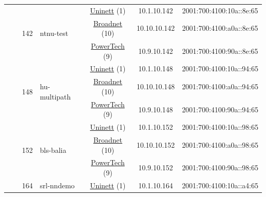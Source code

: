 \begin{small}
\begin{center}
\begin{longtable}{|c|c|c|c|c|c|c|c|}
  &  & \multirow{3}{*}{\tiny{142}} & \multicolumn{1}{|l|}{\multirow{3}{*}{\tiny{ntnu-test}}} & \multicolumn{2}{|c|}{\tiny{\href{https://www.uninett.no}{Uninett} (1)}} & \tiny{10.1.10.142} & \tiny{2001:700:4100:10a::8e:65} \\* \cline{5-5}\cline{6-6}\cline{7-7}\cline{8-8}
  &  &  &  & \multicolumn{2}{|c|}{\tiny{\href{https://www.broadnet.no}{Broadnet} (10)}} & \tiny{10.10.10.142} & \tiny{2001:700:4100:a0a::8e:65} \\* \cline{5-5}\cline{6-6}\cline{7-7}\cline{8-8}
  &  &  &  & \multicolumn{2}{|c|}{\tiny{\href{http://www.powertech.no}{PowerTech} (9)}} & \tiny{10.9.10.142} & \tiny{2001:700:4100:90a::8e:65} \\* \cline{3-3}\cline{4-4}\cline{5-5}\cline{6-6}\cline{7-7}\cline{8-8}
  &  & \multirow{3}{*}{\tiny{148}} & \multicolumn{1}{|l|}{\multirow{3}{*}{\tiny{hu-multipath}}} & \multicolumn{2}{|c|}{\tiny{\href{https://www.uninett.no}{Uninett} (1)}} & \tiny{10.1.10.148} & \tiny{2001:700:4100:10a::94:65} \\* \cline{5-5}\cline{6-6}\cline{7-7}\cline{8-8}
  &  &  &  & \multicolumn{2}{|c|}{\tiny{\href{https://www.broadnet.no}{Broadnet} (10)}} & \tiny{10.10.10.148} & \tiny{2001:700:4100:a0a::94:65} \\* \cline{5-5}\cline{6-6}\cline{7-7}\cline{8-8}
  &  &  &  & \multicolumn{2}{|c|}{\tiny{\href{http://www.powertech.no}{PowerTech} (9)}} & \tiny{10.9.10.148} & \tiny{2001:700:4100:90a::94:65} \\* \cline{3-3}\cline{4-4}\cline{5-5}\cline{6-6}\cline{7-7}\cline{8-8}
  &  & \multirow{3}{*}{\tiny{152}} & \multicolumn{1}{|l|}{\multirow{3}{*}{\tiny{bls-balia}}} & \multicolumn{2}{|c|}{\tiny{\href{https://www.uninett.no}{Uninett} (1)}} & \tiny{10.1.10.152} & \tiny{2001:700:4100:10a::98:65} \\* \cline{5-5}\cline{6-6}\cline{7-7}\cline{8-8}
  &  &  &  & \multicolumn{2}{|c|}{\tiny{\href{https://www.broadnet.no}{Broadnet} (10)}} & \tiny{10.10.10.152} & \tiny{2001:700:4100:a0a::98:65} \\* \cline{5-5}\cline{6-6}\cline{7-7}\cline{8-8}
  &  &  &  & \multicolumn{2}{|c|}{\tiny{\href{http://www.powertech.no}{PowerTech} (9)}} & \tiny{10.9.10.152} & \tiny{2001:700:4100:90a::98:65} \\* \cline{3-3}\cline{4-4}\cline{5-5}\cline{6-6}\cline{7-7}\cline{8-8}
  &  & \multirow{3}{*}{\tiny{164}} & \multicolumn{1}{|l|}{\multirow{3}{*}{\tiny{srl-nndemo}}} & \multicolumn{2}{|c|}{\tiny{\href{https://www.uninett.no}{Uninett} (1)}} & \tiny{10.1.10.164} & \tiny{2001:700:4100:10a::a4:65} \\* \cline{5-5}\cline{6-6}\cline{7-7}\cline{8-8}

\end{longtable}
\end{center}
\end{small}
